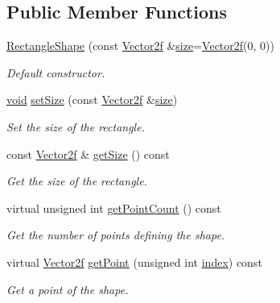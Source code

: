 \subsection*{Public Member Functions}
\begin{DoxyCompactItemize}
\item 
\hyperlink{classsf_1_1_rectangle_shape_a83a2be157ebee85c95ed491c3e78dd7c}{Rectangle\-Shape} (const \hyperlink{namespacesf_acf03098c2577b869e2fa6836cc48f1a0}{Vector2f} \&\hyperlink{gl3_8h_a79ef9eb3e59c4bb34c4b9fbeb8d28ff7}{size}=\hyperlink{namespacesf_acf03098c2577b869e2fa6836cc48f1a0}{Vector2f}(0, 0))
\begin{DoxyCompactList}\small\item\em Default constructor. \end{DoxyCompactList}\item 
\hyperlink{glutf90_8h_ac778d6f63f1aaf8ebda0ce6ac821b56e}{void} \hyperlink{classsf_1_1_rectangle_shape_a5c65d374d4a259dfdc24efdd24a5dbec}{set\-Size} (const \hyperlink{namespacesf_acf03098c2577b869e2fa6836cc48f1a0}{Vector2f} \&\hyperlink{gl3_8h_a79ef9eb3e59c4bb34c4b9fbeb8d28ff7}{size})
\begin{DoxyCompactList}\small\item\em Set the size of the rectangle. \end{DoxyCompactList}\item 
const \hyperlink{namespacesf_acf03098c2577b869e2fa6836cc48f1a0}{Vector2f} \& \hyperlink{classsf_1_1_rectangle_shape_acaacbaee87c38a526a9d895742faab54}{get\-Size} () const 
\begin{DoxyCompactList}\small\item\em Get the size of the rectangle. \end{DoxyCompactList}\item 
virtual unsigned int \hyperlink{classsf_1_1_rectangle_shape_a439f5a92583baf972878c836b73bf955}{get\-Point\-Count} () const 
\begin{DoxyCompactList}\small\item\em Get the number of points defining the shape. \end{DoxyCompactList}\item 
virtual \hyperlink{namespacesf_acf03098c2577b869e2fa6836cc48f1a0}{Vector2f} \hyperlink{classsf_1_1_rectangle_shape_a3994f7f937d6332fe64b6990d5bc43a1}{get\-Point} (unsigned int \hyperlink{gl3_8h_a57f14e05b1900f16a2da82ade47d0c6d}{index}) const 
\begin{DoxyCompactList}\small\item\em Get a point of the shape. \end{DoxyCompactList}\end{DoxyCompactItemize}
